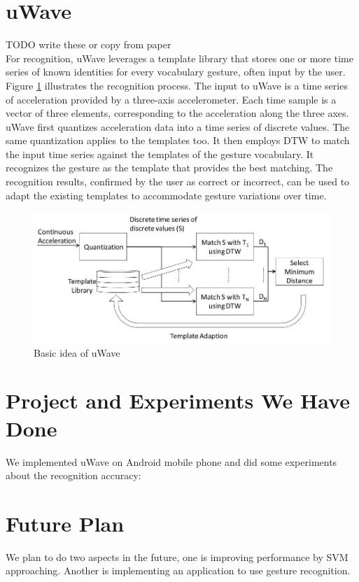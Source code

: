 \documentclass{acm_proc_article-sp}
\begin{document}
\section{uWave}
TODO write these or copy from paper\\
For recognition, uWave leverages a template library that stores one or more time series of known identities for every vocabulary gesture, often input by the user. Figure \ref{uWaveBasic} illustrates the recognition process. The input to uWave is a time series of
acceleration provided by a three-axis accelerometer. Each time sample is a vector of three elements, corresponding to the acceleration along the three axes. uWave first quantizes acceleration data into a time series of discrete values. The same quantization applies to the templates too. It then employs DTW to match the input time series against the templates of the gesture vocabulary. It recognizes the gesture as the template that provides the best matching. The recognition results,
confirmed by the user as correct or incorrect, can be used to adapt the existing templates to accommodate gesture variations over time.
\begin{figure}
  \includegraphics[width=0.8\linewidth]{uWave_basic.JPG}
  \caption{Basic idea of uWave}
  \label{uWaveBasic}
\end{figure}


\section{Project and Experiments We Have Done}
We implemented uWave on Android mobile phone and did some experiments about the recognition accuracy:  


\section{Future Plan}
We plan to do two aspects in the future, one is improving performance by SVM approaching. Another is implementing an application to use gesture recognition.
\end{document}
